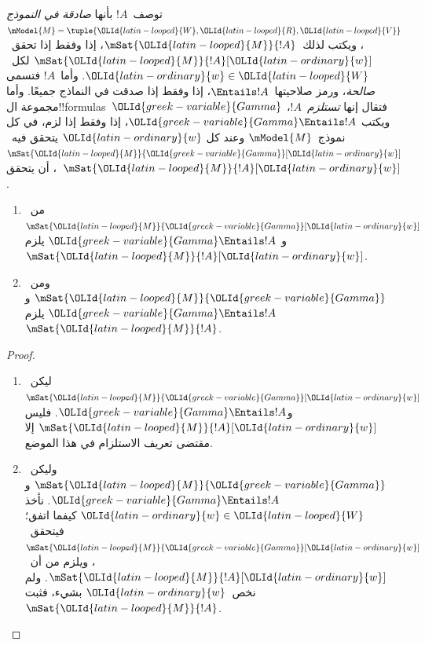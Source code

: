 \documentclass[../../../include/open-logic-section]{subfiles}
\begin{document}


\begin{defn}
  توصف~$!A$ بأنها \emph{صادقة في النموذج
    $\mModel{M}=\tuple{\OLId{latin-looped}{W},\OLId{latin-looped}{R},\OLId{latin-looped}{V}}$}، ويكتب لذلك~$\mSat{\OLId{latin-looped}{M}}{!A}$، إذا وفقط إذا
  تحقق~$\mSat{\OLId{latin-looped}{M}}{!A}[\OLId{latin-ordinary}{w}]$ لكل~$\OLId{latin-ordinary}{w} \in \OLId{latin-looped}{W}$. وأما~$!A$ فتسمى \emph{صالحة}،
  ورمز صلاحيتها~$\Entails !A$، إذا وفقط إذا صدقت في النماذج جميعًا. وأما مجموعة
  ال!!{formula}s~$\OLId{greek-variable}{Gamma}$ فتقال إنها \emph{تستلزم}~$!A$، ويكتب
  $\OLId{greek-variable}{Gamma} \Entails !A$، إذا وفقط إذا لزم، في كل نموذج~$\mModel{M}$ وعند كل
  $\OLId{latin-ordinary}{w}$ يتحقق فيه~$\mSat{\OLId{latin-looped}{M}}{\OLId{greek-variable}{Gamma}}[\OLId{latin-ordinary}{w}]$، أن يتحقق~$\mSat{\OLId{latin-looped}{M}}{!A}[\OLId{latin-ordinary}{w}]$.
\end{defn}

\begin{prop}
  \begin{enumerate}
  \item{} من~$\mSat{\OLId{latin-looped}{M}}{\OLId{greek-variable}{Gamma}}[\OLId{latin-ordinary}{w}]$ و
    $\OLId{greek-variable}{Gamma} \Entails !A$ يلزم~$\mSat{\OLId{latin-looped}{M}}{!A}[\OLId{latin-ordinary}{w}]$.
  \item{} ومن~$\mSat{\OLId{latin-looped}{M}}{\OLId{greek-variable}{Gamma}}$ و
    $\OLId{greek-variable}{Gamma} \Entails !A$ يلزم~$\mSat{\OLId{latin-looped}{M}}{!A}$.
  \end{enumerate}
\end{prop}

\begin{proof}
  \begin{enumerate}
  \item ليكن~$\mSat{\OLId{latin-looped}{M}}{\OLId{greek-variable}{Gamma}}[\OLId{latin-ordinary}{w}]$ و$\OLId{greek-variable}{Gamma} \Entails !A$. فليس
    $\mSat{\OLId{latin-looped}{M}}{!A}[\OLId{latin-ordinary}{w}]$ إلا مقتضى تعريف الاستلزام في هذا الموضع.
  \item وليكن~$\mSat{\OLId{latin-looped}{M}}{\OLId{greek-variable}{Gamma}}$ و$\OLId{greek-variable}{Gamma} \Entails !A$. نأخذ
    $\OLId{latin-ordinary}{w} \in \OLId{latin-looped}{W}$ كيفما اتفق؛ فيتحقق~$\mSat{\OLId{latin-looped}{M}}{\OLId{greek-variable}{Gamma}}[\OLId{latin-ordinary}{w}]$، ويلزم من
     أن~$\mSat{\OLId{latin-looped}{M}}{!A}[\OLId{latin-ordinary}{w}]$. ولم نخص~$\OLId{latin-ordinary}{w}$
    بشيء، فثبت~$\mSat{\OLId{latin-looped}{M}}{!A}$.
  \end{enumerate}
\end{proof}
\end{document}

